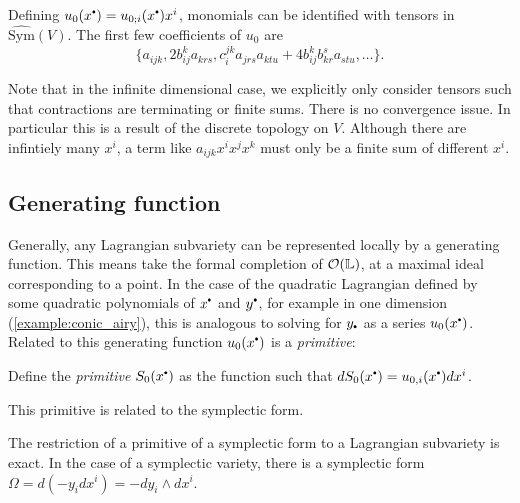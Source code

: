     

    
    Defining \( u_0(x^{\sbt}) = u_{0;i}(x^{\sbt}) x^i \), monomials can be identified with tensors in \( \widehat{\mathrm{Sym}}(V) \). The first few coefficients of \(u_0\) are 
    \[ \{ a_{ijk} , 2 b^k_{ij} a_{krs} , c_i^{jk} a_{jrs} a_{ktu}  +  4 b_{ij}^{k} b_{kr}^s a_{s tu} , \dots \}. \]
    \begin{rem}
    Note that in the infinite dimensional case, we explicitly only consider tensors such that contractions are terminating or finite sums. There is no convergence issue. In particular this is a result of the discrete topology on \(V\). Although there are infintiely many \(x^i\), a term like \(a_{ijk} x^i x^j x^k\) must only be a finite sum of different \(x^i\).
    \end{rem}
    
    \subsection{Generating function}    
    
    Generally, any Lagrangian subvariety can be represented locally by a generating function. This means take the formal completion of \( \mathcal{O}(\mathbb{L})\), at a maximal ideal corresponding to a point. In the case of the quadratic Lagrangian defined by some quadratic polynomials of \(x^{\sbt}\) and \(y^{\sbt}\), for example in one dimension (\ref{example:conic_airy}), this is analogous to solving for \(y_{\sbt}\) as a series \(u_0(x^{\sbt})\). Related to this generating function \( u_0(x^{\sbt})\) is a \emph{primitive}:
    
    \begin{defn}[Primitive] Define the \emph{primitive} \( S_0(x^{\sbt})\) as the function such that \( d S_0(x^{\sbt}) = u_{0,i}(x^{\sbt}) dx^i\).
    \end{defn}
    
    This primitive is related to the symplectic form.
    
    The restriction of a primitive of a symplectic form to a Lagrangian subvariety is exact. In the case of a symplectic variety, there is a symplectic form \( \Omega = d ( - y_i  dx^i)= - d y_i \wedge d x^i \).
    
